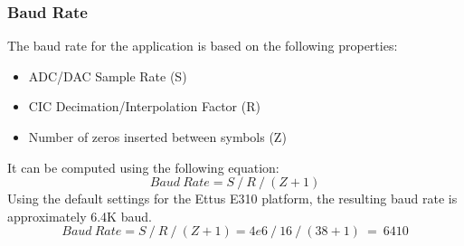 \subsubsection{Baud Rate}
The baud rate for the application is based on the following properties:
	\begin{itemize}
		\item ADC/DAC Sample Rate (S)
		\item CIC Decimation/Interpolation Factor (R)
		\item Number of zeros inserted between symbols (Z)
	\end{itemize}
It can be computed using the following equation:
	      \begin{equation} \label{eq:cic_gain}
	      	Baud\ Rate = S\ /\ R\ /\ (Z +1)
	      \end{equation}
Using the default settings for the Ettus E310 platform, the resulting baud rate is approximately 6.4K baud.
	      \begin{equation} \label{eq:cic_gain}
	      	Baud\ Rate = S\ /\ R\ /\ (Z+1) = 4e6 \ /\ 16\ /\ (38+1) \ =\ 6410
	      \end{equation}
